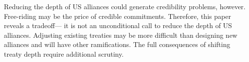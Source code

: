 \documentclass[12pt]{article}
\begin{document}
Reducing the depth of US alliances could generate credibility problems, however. 
Free-riding may be the price of credible commitments.  
Therefore, this paper reveals a tradeoff--- it is not an unconditional call to reduce the depth of US alliances. 
Adjusting existing treaties may be more difficult than designing new alliances and will have other ramifications. 
The full consequences of shifting treaty depth require additional scrutiny. 

 



 
 
\end{document}
